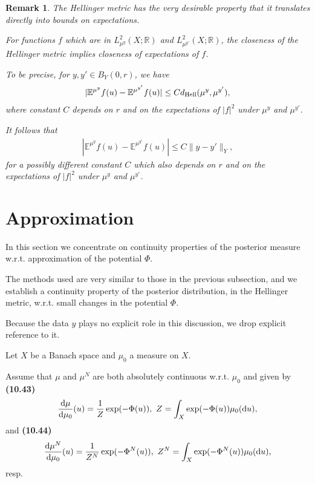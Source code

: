 \documentclass[oneside,11pt]{book}
\numberwithin{equation}{section}
\newtheorem{remark}{Remark}[section]
\begin{document}
\begin{remark}
    The Hellinger metric has the very desirable property that it translates directly into bounds on expectations.
    
    For functions $f$ which are in $L_{\mu^y}^2(X;\mathbb{R})$ and $L_{\mu^{y'}}^2(X;\mathbb{R})$, the closeness of the Hellinger metric implies closeness of expectations of $f$.
    
    To be precise, for $y,y'\in B_Y(0,r)$, we have
    \begin{align*}
        |\mathbb{E}^{\mu^y}f(u) - \mathbb{E}^{\mu^{y'}}f(u)|\le Cd_{\rm Hell}(\mu^y,\mu^{y'}),
    \end{align*}
    where constant $C$ depends on $r$ and on the expectations of $|f|^2$ under $\mu^y$ and $\mu^{y'}$.
    
    It follows that
    \begin{align*}
        |\mathbb{E}^{\mu^y}f(u) - \mathbb{E}^{\mu^{y'}}f(u)|\le C\|y - y'\|_Y,
    \end{align*}
    for a possibly different constant $C$ which also depends on $r$ and on the expectations of $|f|^2$ under $\mu^y$ and $\mu^{y'}$.
\end{remark}

\section{Approximation}
In this section we concentrate on continuity properties of the posterior measure w.r.t. approximation of the potential $\Phi$.

The methods used are very similar to those in the previous subsection, and we establish a continuity property of the posterior distribution, in the Hellinger metric, w.r.t. small changes in the potential $\Phi$.

%
Because the data $y$ plays no explicit role in this discussion, we drop explicit reference to it.

Let $X$ be a Banach space and $\mu_0$ a measure on $X$.

Assume that $\mu$ and $\mu^N$ are both absolutely continuous w.r.t. $\mu_0$ and given by \textbf{(10.43)}
\begin{align*}
    \frac{{\rm d}\mu}{{\rm d}\mu_0}(u) = \frac{1}{Z}\exp(-\Phi(u)),\ Z = \int_X \exp(-\Phi(u))\mu_0({\rm d}u),
\end{align*}
and \textbf{(10.44)}
\begin{align*}
    \frac{{\rm d}\mu^N}{{\rm d}\mu_0}(u) = \frac{1}{Z^N}\exp(-\Phi^N(u)),\ Z^N = \int_X \exp(-\Phi^N(u))\mu_0({\rm d}u),
\end{align*}
resp.
\end{document}
